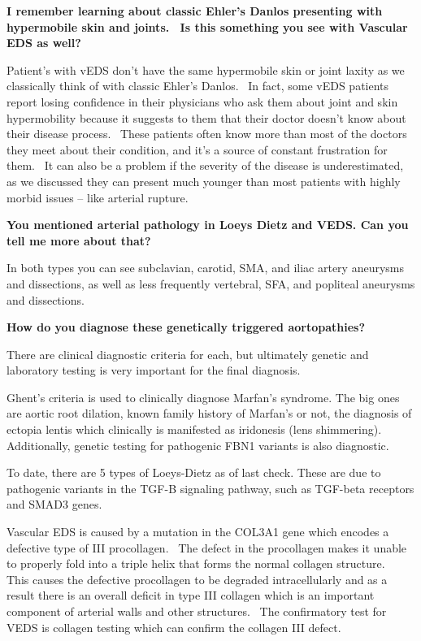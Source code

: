 \documentclass[
]{book}
\begin{document}
\textbf{I remember learning about classic Ehler's Danlos presenting with
hypermobile skin and joints.~ Is this something you see with Vascular
EDS as well?}

Patient's with vEDS don't have the same hypermobile skin or joint laxity
as we classically think of with classic Ehler's Danlos.~ In fact, some
vEDS patients report losing confidence in their physicians who ask them
about joint and skin hypermobility because it suggests to them that
their doctor doesn't know about their disease process.~ These patients
often know more than most of the doctors they meet about their
condition, and it's a source of constant frustration for them.~ It can
also be a problem if the severity of the disease is underestimated, as
we discussed they can present much younger than most patients with
highly morbid issues -- like arterial rupture.

\textbf{You mentioned arterial pathology in Loeys Dietz and VEDS. Can you tell
me more about that?}

In both types you can see subclavian, carotid, SMA, and iliac artery
aneurysms and dissections, as well as less frequently vertebral, SFA,
and popliteal aneurysms and dissections.

\textbf{How do you diagnose these genetically triggered aortopathies?}

There are clinical diagnostic criteria for each, but ultimately genetic
and laboratory testing is very important for the final diagnosis.

Ghent's criteria is used to clinically diagnose Marfan's syndrome. The
big ones are aortic root dilation, known family history of Marfan's or
not, the diagnosis of ectopia lentis which clinically is manifested as
iridonesis (lens shimmering). Additionally, genetic testing for
pathogenic FBN1 variants is also diagnostic.

To date, there are 5 types of Loeys-Dietz as of last check. These are
due to pathogenic variants in the TGF-B signaling pathway, such as
TGF-beta receptors and SMAD3 genes.~

Vascular EDS is caused by a mutation in the COL3A1 gene which encodes a
defective type of III procollagen.~ The defect in the procollagen makes
it unable to properly fold into a triple helix that forms the normal
collagen structure.~ This causes the defective procollagen to be
degraded intracellularly and as a result there is an overall deficit in
type III collagen which is an important component of arterial walls and
other structures.~ The confirmatory test for VEDS is collagen testing
which can confirm the collagen III defect.
\end{document}

